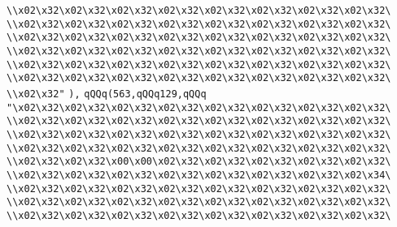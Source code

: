 \verb|\\x02\x32\x02\x32\x02\x32\x02\x32\x02\x32\x02\x32\x02\x32\x02\x32\|\newline
\verb|\\x02\x32\x02\x32\x02\x32\x02\x32\x02\x32\x02\x32\x02\x32\x02\x32\|\newline
\verb|\\x02\x32\x02\x32\x02\x32\x02\x32\x02\x32\x02\x32\x02\x32\x02\x32\|\newline
\verb|\\x02\x32\x02\x32\x02\x32\x02\x32\x02\x32\x02\x32\x02\x32\x02\x32\|\newline
\verb|\\x02\x32\x02\x32\x02\x32\x02\x32\x02\x32\x02\x32\x02\x32\x02\x32\|\newline
\verb|\\x02\x32\x02\x32\x02\x32\x02\x32\x02\x32\x02\x32\x02\x32\x02\x32\|\newline
\verb|\\x02\x32"|\newline
\verb|),|\newline
\verb|qQQq(563,qQQq129,qQQq|\newline
\verb|"\x02\x32\x02\x32\x02\x32\x02\x32\x02\x32\x02\x32\x02\x32\x02\x32\|\newline
\verb|\\x02\x32\x02\x32\x02\x32\x02\x32\x02\x32\x02\x32\x02\x32\x02\x32\|\newline
\verb|\\x02\x32\x02\x32\x02\x32\x02\x32\x02\x32\x02\x32\x02\x32\x02\x32\|\newline
\verb|\\x02\x32\x02\x32\x02\x32\x02\x32\x02\x32\x02\x32\x02\x32\x02\x32\|\newline
\verb|\\x02\x32\x02\x32\x00\x00\x02\x32\x02\x32\x02\x32\x02\x32\x02\x32\|\newline
\verb|\\x02\x32\x02\x32\x02\x32\x02\x32\x02\x32\x02\x32\x02\x32\x02\x34\|\newline
\verb|\\x02\x32\x02\x32\x02\x32\x02\x32\x02\x32\x02\x32\x02\x32\x02\x32\|\newline
\verb|\\x02\x32\x02\x32\x02\x32\x02\x32\x02\x32\x02\x32\x02\x32\x02\x32\|\newline
\verb|\\x02\x32\x02\x32\x02\x32\x02\x32\x02\x32\x02\x32\x02\x32\x02\x32\|\newline
